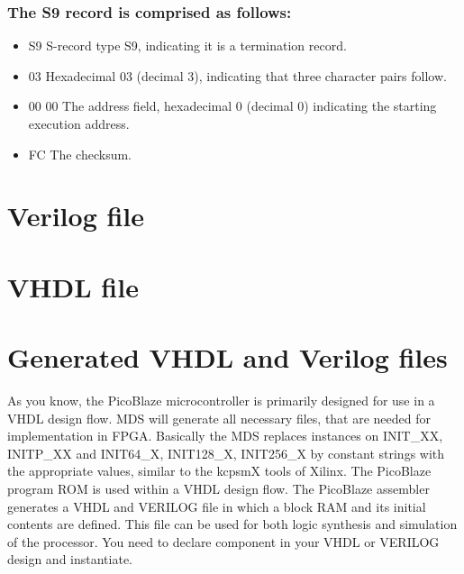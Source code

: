                 \subsubsection{The S9 record is comprised as follows:}
                    \begin{itemize}
                        \item S9 S-record type S9, indicating it is a termination record.
                        \item 03 Hexadecimal 03 (decimal 3), indicating that three character pairs follow.
                        \item 00 00 The address field, hexadecimal 0 (decimal 0) indicating the starting execution address.
                        \item FC The checksum.
                    \end{itemize}

        \section{Verilog file}
        \section{VHDL file}
        \section{Generated VHDL and Verilog files}
            As you know, the PicoBlaze microcontroller is primarily designed for use in a VHDL design flow.
            MDS will generate all necessary files, that are needed for
            implementation in FPGA. Basically the MDS replaces instances on
            {INIT\_XX}, {INITP\_XX} and {INIT64\_X}, {INIT128\_X}, {INIT256\_X} by constant strings with the appropriate values, similar to the kcpsmX tools of Xilinx.
            The PicoBlaze program ROM is used within a VHDL design flow. The PicoBlaze assembler
            generates a VHDL and VERILOG file in which a block RAM and its initial contents are defined. This
            file can be used for both logic synthesis and simulation of the processor.
            You need to declare component in your VHDL or VERILOG design and instantiate.
